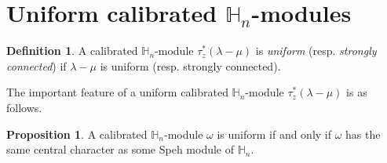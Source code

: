 \documentclass[11pt]{amsart}
\numberwithin{equation}{section}
\theoremstyle{definition}
\newtheorem{proposition}[thm]{Proposition}
\newtheorem{definition}[thm]{Definition}
\begin{document}




\section{Uniform calibrated $\mathbb H_n$-modules}\label{sec uniform calibrated modules}


\begin{definition}
 A calibrated $\mathbb H_n$-module $\tau^*_z(\lambda-\mu)$ is {\it uniform} (resp. \emph{strongly connected})  if $\lambda-\mu$ is uniform (resp. strongly connected).
\end{definition}


The important feature of a uniform calibrated \(\mathbb H_n\)-module \(\tau^*_z(\lambda-\mu)\) is as follows.

\begin{proposition}
A calibrated $\mathbb H_n$-module $\omega$ is uniform if and only if $\omega$ has the same central character as some Speh module of $\mathbb H_n$.
\end{proposition}
\end{document}
